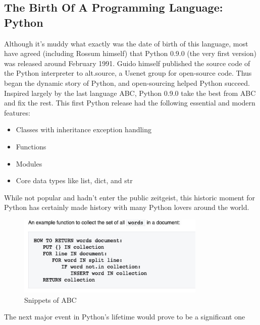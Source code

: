 \documentclass[twoside,final]{hcmut-report}
\begin{document}
\subsection{The Birth Of A Programming Language: Python }
Although it's muddy what exactly was the date of birth of this language, most have agreed (including Rossum himself) that Python 0.9.0 (the very first version) was released around February 1991. Guido himself published the source code of the Python interpreter to alt.source, a Usenet group for open-source code. Thus began the dynamic story of Python, and open-sourcing helped Python succeed.\\
\hspace*{3mm} Inspired largely by the last language ABC, Python 0.9.0 take the best from ABC and fix the rest. This first Python release had the following essential and modern features:
\begin{itemize}
\item Classes with inheritance exception handling
\item Functions
\item Modules
\item Core data types like list, dict, and str

\end{itemize}
While not popular and hadn't enter the public zeitgeist, this historic moment for Python has certainly made history with many Python lovers around the world. 

\begin{figure}[ht]
\centering
\includegraphics[width=0.8\textwidth]{graphics/ABC.jpeg}
\caption{Snippets of ABC}
\end{figure}
The next major event in Python's lifetime would prove to be a significant one
\end{document}
